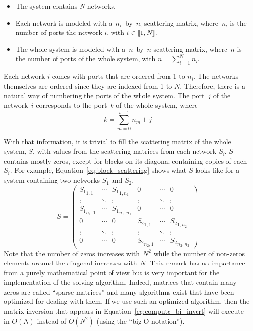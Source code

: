 \begin{itemize}
    \item 
The system contains $N$ networks.
    \item 
Each network is modeled with a~$n_i$--by--$n_i$ scattering matrix, where~$n_i$ is the number of ports the network $i$, with $i \in \llbracket 1, N \rrbracket$.
    \item 
The whole system is modeled with a~$n$--by--$n$ scattering matrix, where~$n$ is the number of ports of the whole system, with $n = \sum_{i=1}^N n_i$.
\end{itemize}

Each network $i$ comes with ports that are ordered from 1 to $n_i$.
The networks themselves are ordered since they are indexed from 1 to $N$.
Therefore, there is a natural way of numbering the ports of the whole system.
The port~$j$ of the network~$i$ corresponds to the port~$k$ of the whole system, where
\begin{equation}
    k = \sum_{m=0}^{i - 1}n_m + j \label{eq:port_numbering}
\end{equation}

With that information, it is trivial to fill the scattering matrix of the whole system, $S$, with values from the scattering matrices from each network $S_i$.
$S$ contains mostly zeros, except for blocks on its diagonal containing copies of each~$S_i$.
For example, Equation~\eqref{eq:block_scattering} shows what $S$ looks like for a system containing two networks $S_1$ and $S_2$.
\begin{equation}
    S =
    \begin{pmatrix}
        {S_1}_{1, 1} & \cdots & {S_1}_{1, n_1} &
        0 & \cdots & 0
        \\
        \vdots & \ddots &\vdots &
        \vdots & \ddots &\vdots 
        \\
        {S_1}_{n_1, 1} & \cdots & {S_1}_{n_1, n_1} &
        0 & \cdots & 0
        \\
        0 & \cdots & 0 &
        {S_2}_{1, 1} & \cdots & {S_2}_{1, n_2}
        \\
        \vdots & \ddots &\vdots &
        \vdots & \ddots &\vdots
        \\
        0 & \cdots & 0 &
        {S_2}_{n_2, 1} & \cdots & {S_2}_{n_2, n_2}
    \end{pmatrix}
    \label{eq:block_scattering}
\end{equation}
Note that the number of zeros increases with~$N^2$ while the number of non-zeros elements around the diagonal increases with~$N$.
This remark has no importance from a purely mathematical point of view but is very important for the implementation of the solving algorithm.
Indeed, matrices that contain many zeros are called ``sparse matrices'' and many algorithms exist that have been optimized for dealing with them.
If we use such an optimized algorithm, then the matrix inversion that appears in Equation~\eqref{eq:compute_bi_invert} will execute in $O(N)$ instead of $O(N^2)$ (using the ``big O notation'').

